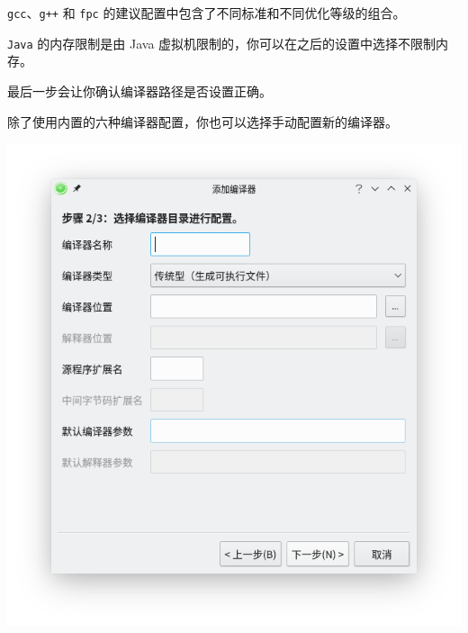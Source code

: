 \documentclass[UTF-8]{ctexart}
\begin{document}
				\texttt{gcc}、\texttt{g++} 和 \texttt{fpc} 的建议配置中包含了不同标准和不同优化等级的组合。
				
				\texttt{Java} 的内存限制是由 Java 虚拟机限制的，你可以在之后的设置中选择不限制内存。
				
				最后一步会让你确认编译器路径是否设置正确。
				
				除了使用内置的六种编译器配置，你也可以选择手动配置新的编译器。
				
				\begin{center}
					\includegraphics[scale=0.7]{pics/addcompiler2.png}
				\end{center}
				
\end{document}
